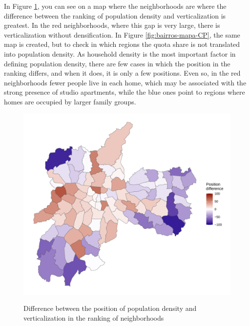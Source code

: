 \begin{apendicesenv}
    In Figure \ref{fig:bairros-mapa}, you can see on a map where the neighborhoods are where the difference between the ranking of population density and verticalization is greatest. In the red neighborhoods, where this gap is very large, there is verticalization without densification. In Figure \ref{fig:bairros-mapa-CP}, the same map is created, but to check in which regions the quota share is not translated into population density. As household density is the most important factor in defining population density, there are few cases in which the position in the ranking differs, and when it does, it is only a few positions. Even so, in the red neighborhoods fewer people live in each home, which may be associated with the strong presence of studio apartments, while the blue ones point to regions where homes are occupied by larger family groups.
    
    \begin{figure}[!h]
        \centering
        \caption{Difference between the position of population density and verticalization in the ranking of neighborhoods}
        \includegraphics[width = \linewidth]{figuras/bairros-mapa.pdf}
        \label{fig:bairros-mapa}
    \end{figure}
    

\end{apendicesenv}
